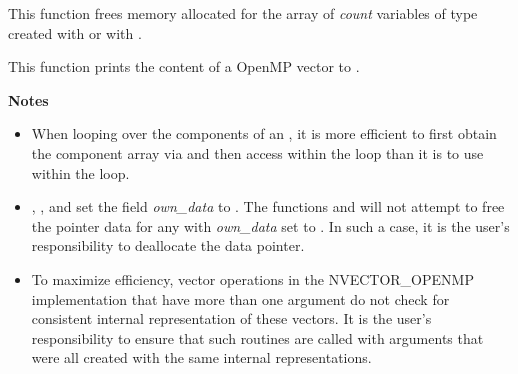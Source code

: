 \documentclass[letterpaper,10pt,english]{sphinxmanual}
\begin{document}

\begin{fulllineitems}
\label{nvectors/NVector_OpenMP:c.N_VDestroyVectorArray_OpenMP}
This function frees memory allocated for the array of \emph{count}
variables of type  created with
{\hyperref[nvectors/NVector_OpenMP:c.N_VCloneVectorArray_OpenMP]{\emph{}}} or with
{\hyperref[nvectors/NVector_OpenMP:c.N_VCloneEmptyVectorArray_OpenMP]{\emph{}}}.

\end{fulllineitems}


\begin{fulllineitems}
\label{nvectors/NVector_OpenMP:c.N_VPrint_OpenMP}
This function prints the content of a OpenMP vector to .

\end{fulllineitems}


\textbf{Notes}
\begin{itemize}
\item {} 
When looping over the components of an , it is more
efficient to first obtain the component array via  and then access  within the loop than it
is to use  within the loop.

\item {} 
{\hyperref[nvectors/NVector_OpenMP:c.N_VNewEmpty_OpenMP]{\emph{}}}, {\hyperref[nvectors/NVector_OpenMP:c.N_VMake_OpenMP]{\emph{}}}, and
{\hyperref[nvectors/NVector_OpenMP:c.N_VCloneEmptyVectorArray_OpenMP]{\emph{}}} set the field \emph{own\_data}
to .  The functions  and
{\hyperref[nvectors/NVector_OpenMP:c.N_VDestroyVectorArray_OpenMP]{\emph{}}} will not attempt to free the
pointer data for any  with \emph{own\_data} set to .
In such a case, it is the user's responsibility to deallocate the
data pointer.

\item {} 
To maximize efficiency, vector operations in the NVECTOR\_OPENMP
implementation that have more than one  argument do not
check for consistent internal representation of these vectors. It is
the user's responsibility to ensure that such routines are called
with  arguments that were all created with the same
internal representations.

\end{itemize}
\end{document}

